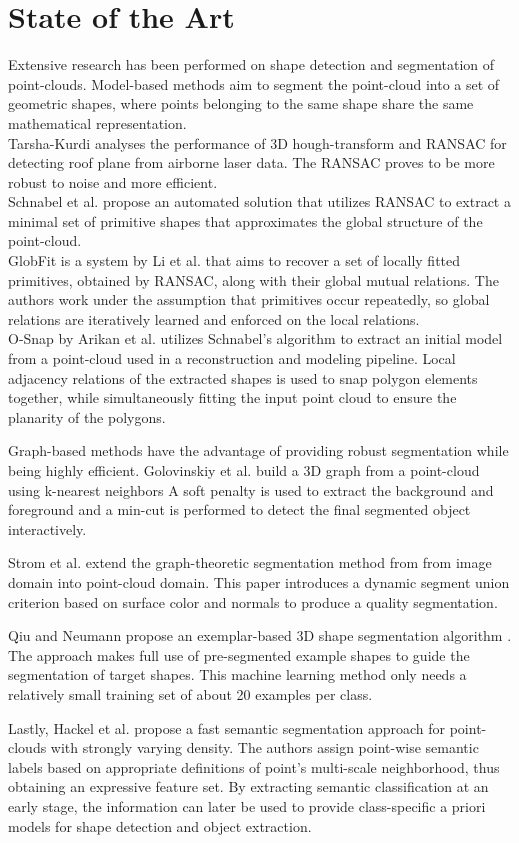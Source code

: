 \section{State of the Art}
Extensive research has been performed on shape detection and segmentation of point-clouds. Model-based methods aim to segment the point-cloud into a set of geometric shapes, where points belonging to the same shape share the same mathematical representation. 
\\
Tarsha-Kurdi\cite{tarsha2007hough} analyses the performance of 3D hough-transform and RANSAC for detecting roof plane from airborne laser data. The RANSAC proves to be more robust to noise and more efficient.
\\
Schnabel et al. \cite{schnabel-2007-efficient} propose an automated solution that utilizes RANSAC to extract a minimal set of primitive shapes that approximates the global structure of the point-cloud.  
\\
GlobFit is a system by Li et al. \cite{li2011globfit} that aims to recover a set of locally fitted primitives, obtained by RANSAC, along with their global mutual relations. The authors work under the assumption that primitives occur repeatedly, so global relations are iteratively learned and enforced on the local relations. 
\\
O-Snap by Arikan et al. \cite{arikan-2013-osn} utilizes Schnabel's algorithm to extract an initial model from a point-cloud used in a reconstruction and modeling pipeline. Local adjacency relations of the extracted shapes is used to snap polygon elements together, while simultaneously fitting the input point cloud to ensure the planarity of the polygons. 

Graph-based methods have the advantage of providing robust segmentation while being highly efficient. Golovinskiy et al. \cite{golovinskiy2009min} build a 3D graph from a point-cloud using k-nearest neighbors A soft penalty is used to extract the background and foreground and a min-cut is performed to detect the final segmented object interactively. 

Strom et al. \cite{strom2010graph} extend the graph-theoretic segmentation method from \cite{felzenszwalb2004efficient} from image domain into point-cloud domain. This paper introduces a dynamic segment union criterion based on surface color and normals to produce a quality segmentation. 

Qiu and Neumann propose an exemplar-based 3D shape segmentation algorithm  \cite{qiu2016exemplar}. The approach makes full use of pre-segmented example shapes to guide the segmentation of target shapes. This machine learning method only needs a relatively small training set of about 20 examples per class.  

Lastly, Hackel et al. \cite{hackel2016fast} propose a fast semantic segmentation approach for point-clouds with strongly varying density. The authors assign point-wise semantic labels based on appropriate definitions of point's multi-scale neighborhood, thus obtaining an expressive feature set. 
By extracting semantic classification at an early stage, the information can later be used to provide class-specific a priori models for shape detection and object extraction. 



